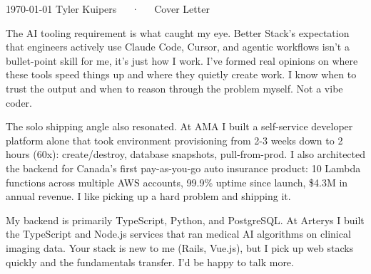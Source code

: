 \documentclass[11pt, a4paper]{awesome-cv}
\begin{document}
\makecvheader[R]

\makecvfooter
  {\today}
  {Tyler Kuipers~~~·~~~Cover Letter}
  {\thepage}

\makelettertitle


\begin{cvletter}

  The AI tooling requirement is what caught my eye. Better Stack's expectation that engineers actively use Claude Code, Cursor, and agentic workflows isn't a bullet-point skill for me, it's just how I work. I've formed real opinions on where these tools speed things up and where they quietly create work. I know when to trust the output and when to reason through the problem myself. Not a vibe coder.

  The solo shipping angle also resonated. At AMA I built a self-service developer platform alone that took environment provisioning from 2-3 weeks down to 2 hours (60x): create/destroy, database snapshots, pull-from-prod. I also architected the backend for Canada's first pay-as-you-go auto insurance product: 10 Lambda functions across multiple AWS accounts, 99.9\% uptime since launch, \$4.3M in annual revenue. I like picking up a hard problem and shipping it.

  My backend is primarily TypeScript, Python, and PostgreSQL. At Arterys I built the TypeScript and Node.js services that ran medical AI algorithms on clinical imaging data. Your stack is new to me (Rails, Vue.js), but I pick up web stacks quickly and the fundamentals transfer. I'd be happy to talk more.

\end{cvletter}

\makeletterclosing



\end{document}
